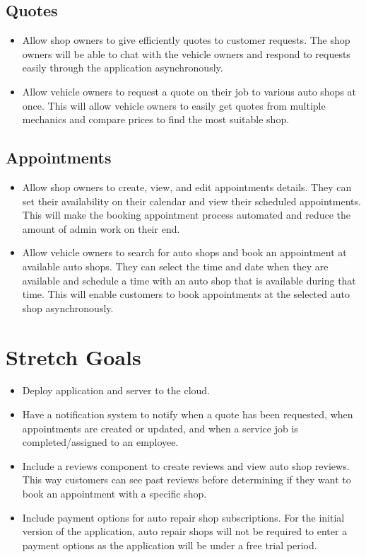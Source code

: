 \documentclass{article}
\begin{document}
\subsection{Quotes}
\begin{itemize}
	\item Allow shop owners to give efficiently quotes to customer requests. The shop owners will be able to
	      chat with the vehicle owners and respond to requests easily through the application asynchronously.
	\item Allow vehicle owners to request a quote on their job to various auto shops at once. This will allow
	      vehicle owners to easily get quotes from multiple mechanics and compare prices to find the most
	      suitable shop.
\end{itemize}

\subsection{Appointments}
\begin{itemize}
	\item Allow shop owners to create, view, and edit appointments details. They can set their availability
	      on their calendar and view their scheduled appointments. This will make the booking appointment
	      process automated and reduce the amount of admin work on their end.
	\item Allow vehicle owners to search for auto shops and book an appointment at available auto shops. They
	      can select the time and date when they are available and schedule a time with an auto shop that is
	      available during that time. This will enable customers to book appointments at the selected auto
	      shop asynchronously.
\end{itemize}

\section{Stretch Goals}
\begin{itemize}
	\item Deploy application and server to the cloud.
	\item Have a notification system to notify when a quote has been requested, when appointments are created
	      or updated, and when a service job is completed/assigned to an employee.
	\item Include a reviews component to create reviews and view auto shop reviews. This way customers can
	      see past reviews before determining if they want to book an appointment with a specific shop.
	\item Include payment options for auto repair shop subscriptions. For the initial version of the
	      application, auto repair shops will not be required to enter a payment options as the application
	      will be under a free trial period.
\end{itemize}
\end{document}
